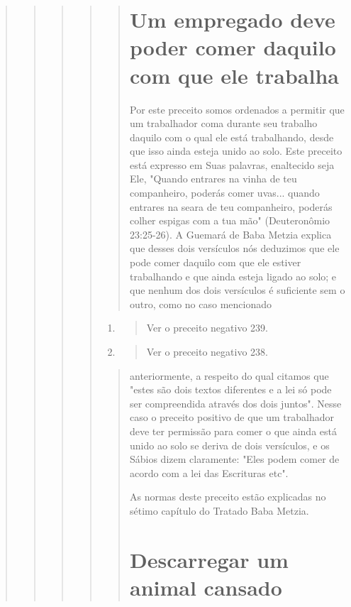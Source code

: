 \begin{quote}
\begin{quote}
\begin{quote}
\begin{quote}
\begin{quote}
\section{Um empregado deve poder comer daquilo com que ele trabalha}

Por este preceito somos ordenados a permitir que um trabalhador coma
durante seu trabalho daquilo com o qual ele está trabalhando, desde que
isso ainda esteja unido ao solo. Este preceito está expresso em Suas
palavras, enaltecido seja Ele, "Quando entrares na vinha de teu
companheiro, poderás comer uvas... quando entrares na seara de teu
companheiro, poderás colher espigas com a tua mão" (Deuteronômio
23:25-26). A Guemará de Baba Metzia explica que desses dois versículos
nós deduzimos que ele pode comer daquilo com que ele estiver trabalhando
e que ainda esteja ligado ao solo; e que ne­nhum dos dois versículos é
suficiente sem o outro, como no caso mencionado
\end{quote}

\begin{enumerate}
\def\labelenumi{\arabic{enumi}.}
\setcounter{enumi}{202}
\item
 \begin{quote}
 Ver o preceito negativo 239.
 \end{quote}
\item
 \begin{quote}
 Ver o preceito negativo 238.
 \end{quote}
\end{enumerate}

\begin{quote}anteriormente, a respeito do qual citamos que "estes são dois textos
diferentes e a lei só pode ser compreendida através dos dois juntos".
Nesse caso o precei­to positivo de que um trabalhador deve ter permissão
para comer o que ainda está unido ao solo se deriva de dois versículos,
e os Sábios dizem claramente: "Eles podem comer de acordo com a lei das
Escrituras etc".

As normas deste preceito estão explicadas no sétimo capítulo do Tra­tado
Baba Metzia.

\section{Descarregar um animal cansado}


\end{quote}
\end{quote}
\end{quote}
\end{quote}
\end{quote}
